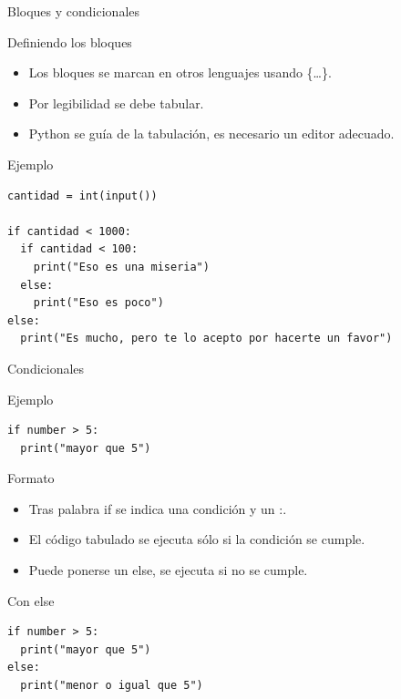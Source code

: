 \documentclass[bigger,unknownkeysallowed]{beamer}
\begin{document}
\begin{frame}[fragile,label={sec:org082da0d}]{Bloques y condicionales}
 \begin{block}{Definiendo los bloques}
\begin{itemize}
\item Los bloques se marcan en otros lenguajes usando \{\ldots{}\}.

\item Por legibilidad se debe tabular.

\item Python se guía de la tabulación, es necesario un editor adecuado.
\end{itemize}
\end{block}

\begin{exampleblock}{Ejemplo}
\begin{verbatim}
cantidad = int(input())

if cantidad < 1000:
  if cantidad < 100:
    print("Eso es una miseria")
  else:
    print("Eso es poco")
else:
  print("Es mucho, pero te lo acepto por hacerte un favor")
\end{verbatim}
\end{exampleblock}
\end{frame}

\begin{frame}[fragile,label={sec:org0a78201}]{Condicionales}
 \begin{exampleblock}{Ejemplo}
\begin{verbatim}
if number > 5:
  print("mayor que 5")
\end{verbatim}
\end{exampleblock}

\begin{block}{Formato}
\begin{itemize}
\item Tras palabra \alert{if} se indica una condición y un \alert{:}.

\item El código tabulado se ejecuta sólo si la condición se cumple.

\item Puede ponerse un else, se ejecuta si no se cumple.
\end{itemize}
\end{block}

\begin{exampleblock}{Con else}
\begin{verbatim}
if number > 5:
  print("mayor que 5")
else:
  print("menor o igual que 5")
\end{verbatim}
\end{exampleblock}
\end{frame}
\end{document}
